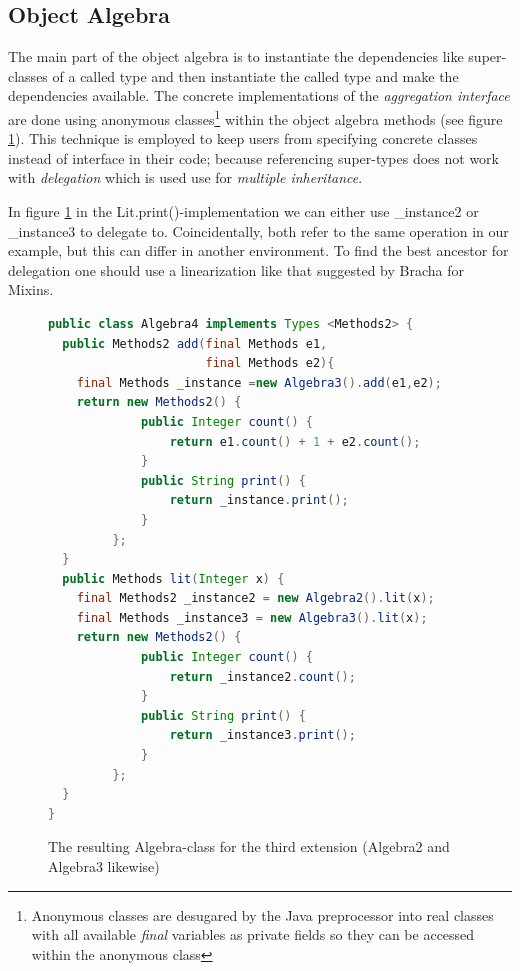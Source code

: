 \documentclass{report}
\begin{document}
\subsection{Object Algebra}

The main part of the object algebra is to instantiate the dependencies like super-classes of a called type and then instantiate the called type and make the dependencies available. The concrete implementations of the \emph{aggregation interface} are done using anonymous classes\footnote{Anonymous classes are desugared by the Java preprocessor into real classes with all available \emph{final} variables as private fields so they can be accessed within the anonymous class} within the object algebra methods (see figure \ref{algebraImplementation}). This technique is employed to keep users from specifying concrete classes instead of interface in their code; because referencing super-types does not work with \emph{delegation} which is used use for \emph{multiple inheritance}.

In figure \ref{algebraImplementation} in the Lit.print()-implementation we can either use \_instance2 or \_instance3 to delegate to. Coincidentally, both refer to the same operation in our example, but this can differ in another environment. To find the best ancestor for delegation one should use a linearization like that suggested by Bracha \cite{Bracha-Mixin-1990} for Mixins.

\begin{figure}[H]
\begin{lstlisting}[language=java]
public class Algebra4 implements Types <Methods2> {
  public Methods2 add(final Methods e1,
                      final Methods e2){
    final Methods _instance =new Algebra3().add(e1,e2);
    return new Methods2() {
             public Integer count() {
                 return e1.count() + 1 + e2.count();
             }
             public String print() {
                 return _instance.print();
             }
         };
  }
  public Methods lit(Integer x) { 
    final Methods2 _instance2 = new Algebra2().lit(x);
    final Methods _instance3 = new Algebra3().lit(x);
    return new Methods2() {
             public Integer count() { 
                 return _instance2.count();
             }
             public String print() { 
                 return _instance3.print();
             }
         };
  }
}
\end{lstlisting}
\caption{The resulting Algebra-class for the third extension (Algebra2 and Algebra3 likewise)}
\label{algebraImplementation}
\end{figure}
\end{document}
